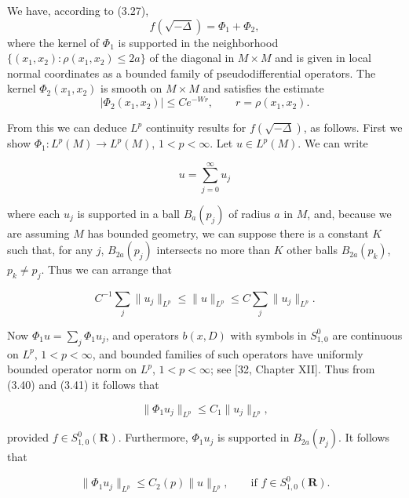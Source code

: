 We have, according to (3.27),
\begin{equation}\tag{3.44}
f(\sqrt{-\Delta})=\Phi_1+\Phi_2,
\end{equation}
where the kernel of $\Phi_1$ is supported in the neighborhood $\{(x_1,x_2): \rho(x_1,x_2)\le 2a\}$ of the diagonal in $M\times M$ and is given in local normal coordinates as a bounded family of pseudodifferential operators. The kernel $\Phi_2(x_1,x_2)$ is smooth on $M\times M$ and satisfies the estimate
\begin{equation}\tag{3.45}
|\Phi_2(x_1,x_2)|\le Ce^{-Wr},\qquad r=\rho(x_1,x_2).
\end{equation}

From this we can deduce $L^{p}$ continuity results for $f(\sqrt{-\Delta})$, as follows. First we show $\Phi_1: L^{p}(M)\to L^{p}(M)$, $1<p<\infty$. Let $u\in L^{p}(M)$. We can write

\begin{equation}\tag{3.46}
u=\sum_{j=0}^{\infty}u_{j}
\end{equation}

where each $u_{j}$ is supported in a ball $B_{a}(p_{j})$ of radius $a$ in $M$, and, because we are assuming $M$ has bounded geometry, we can suppose there is a constant $K$ such that, for any $j$, $B_{2a}(p_{j})$ intersects no more than $K$ other balls $B_{2a}(p_{k})$, $p_{k}\neq p_{j}$. Thus we can arrange that

\begin{equation}\tag{3.47}
C^{-1}\sum_{j}\|u_{j}\|_{L^{p}}\leq \|u\|_{L^{p}}\leq C\sum_{j}\|u_{j}\|_{L^{p}}.
\end{equation}

Now $\Phi_{1}u=\sum_{j}\Phi_{1}u_{j}$, and operators $b(x,D)$ with symbols in $S^{0}_{1,0}$ are continuous on $L^{p}$, $1<p<\infty$, and bounded families of such operators have uniformly bounded operator norm on $L^{p}$, $1<p<\infty$; see [32, Chapter XII]. Thus from (3.40) and (3.41) it follows that

\begin{equation}\tag{3.48}
\|\Phi_{1}u_{j}\|_{L^{p}}\leq C_{1}\|u_{j}\|_{L^{p}},
\end{equation}

provided $f\in S^{0}_{1,0}(\mathbf{R})$. Furthermore, $\Phi_{1}u_{j}$ is supported in $B_{2a}(p_{j})$. It follows that

\begin{equation}\tag{3.49}
\|\Phi_{1}u_{j}\|_{L^{p}}\leq C_{2}(p)\|u\|_{L^{p}}, \qquad \text{if } f\in S^{0}_{1,0}(\mathbf{R}).
\end{equation}

